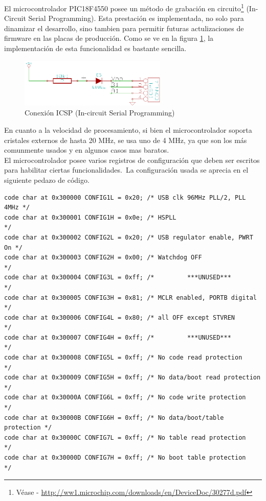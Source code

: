 El microcontrolador PIC18F4550 posee un m\'etodo de grabaci\'on en
circuito\footnote{V\'ease -
\url{http://ww1.microchip.com/downloads/en/DeviceDoc/30277d.pdf}} (In-Circuit
Serial Programming). Esta prestaci\'on es implementada, no solo para dinamizar
el desarrollo, sino tambien para permitir futuras actulizaciones de firmware
en las placas de producci\'on. Como se ve en la figura \ref{fig:icsp}, la
implementaci\'on de esta funcionalidad es bastante sencilla.\\

\begin{figure}[htp]
\centering
\includegraphics[width=7cm]{./img/icsp.png}
\caption{Conexi\'on ICSP (In-circuit Serial Programming)}
\label{fig:icsp}
\end{figure}

En cuanto a la velocidad de procesamiento, si bien el microcontrolador soporta
cristales externos de hasta 20 MHz, se usa uno de 4 MHz, ya que son los m\'as
comunmente usados y en algunos casos mas baratos.\\

El microcontrolador posee varios registros de configuraci\'on que deben ser
escritos para habilitar ciertas funcionalidades.\
La configuraci\'on usada se aprecia en el siguiente pedazo de c\'odigo.

\begin{lstlisting}
code char at 0x300000 CONFIG1L = 0x20; /* USB clk 96MHz PLL/2, PLL 4MHz */
code char at 0x300001 CONFIG1H = 0x0e; /* HSPLL                         */
code char at 0x300002 CONFIG2L = 0x20; /* USB regulator enable, PWRT On */
code char at 0x300003 CONFIG2H = 0x00; /* Watchdog OFF                  */
code char at 0x300004 CONFIG3L = 0xff; /*         ***UNUSED***          */
code char at 0x300005 CONFIG3H = 0x81; /* MCLR enabled, PORTB digital   */
code char at 0x300006 CONFIG4L = 0x80; /* all OFF except STVREN         */
code char at 0x300007 CONFIG4H = 0xff; /*         ***UNUSED***          */
code char at 0x300008 CONFIG5L = 0xff; /* No code read protection       */
code char at 0x300009 CONFIG5H = 0xff; /* No data/boot read protection  */
code char at 0x30000A CONFIG6L = 0xff; /* No code write protection      */
code char at 0x30000B CONFIG6H = 0xff; /* No data/boot/table protection */
code char at 0x30000C CONFIG7L = 0xff; /* No table read protection      */
code char at 0x30000D CONFIG7H = 0xff; /* No boot table protection      */
\end{lstlisting}


